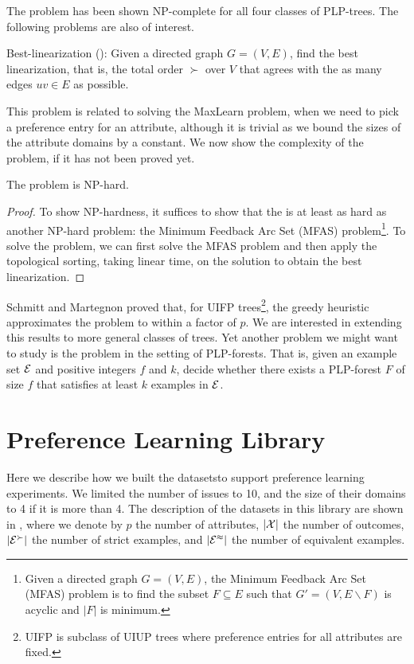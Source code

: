 The  problem has been shown NP-complete
for all four classes of PLP-trees\cite{conf/aaai15/LiuT}.
The following problems are also of interest.

\begin{definition}
	Best-linearization (): Given a directed graph $G=(V,E)$,
	find the best linearization, that is, the total order 
	$\succ$ over $V$ that agrees with the as many 
	edges $uv \in E$ as possible.
\end{definition}
This problem is related to solving the MaxLearn problem,
when we need to pick a preference entry for an attribute,
although it is trivial as we bound the sizes of the
attribute domains by a constant.
We now show the complexity of the  problem,
if it has not been proved yet.

\begin{thm}
	The  problem is NP-hard.
\end{thm}
\begin{proof}
	To show NP-hardness, it suffices to show that the 
	is at least as hard as another NP-hard problem:
	the Minimum Feedback Arc Set (MFAS) problem\footnote{
		Given a directed graph $G=(V,E)$, 
		the Minimum Feedback Arc Set (MFAS) problem 
		is to find the subset
		$F \subseteq E$ such that $G'=(V,E\backslash F)$
		is acyclic and $|F|$ is minimum.
	}.
	To solve the  problem, we can first
	solve the MFAS problem and then apply the topological
	sorting, taking linear time, on the solution to obtain
	the best linearization.
\end{proof}

Schmitt and Martegnon\cite{schmitt2006complexity} proved that, 
for UIFP trees\footnote{
	UIFP is subclass of UIUP trees where preference entries for all
	attributes are fixed.
}, the greedy heuristic approximates the  problem
to within a factor of $p$.
We are interested in extending this results to more general classes
of trees.
Yet another problem we might want to study is the  problem
in the setting of PLP-forests.
That is, given an example set $\mathcal{E}$ and positive integers $f$ and $k$,
decide whether there exists a PLP-forest $F$ of size $f$ that satisfies
at least $k$ examples in $\mathcal{E}$.


\section{Preference Learning Library}
Here we describe how we built the datasets\footnotemark to 
support preference learning experiments.
We limited the number of issues to 10, and the size of
their domains to 4 if it is more than 4.
The description of the datasets in this library are shown
in , where we denote by $p$ the number
of attributes, $|\mathcal{X}|$ the number of outcomes,
$|\mathcal{E}^\succ|$ the number of strict examples, and
$|\mathcal{E}^\approx|$ the number of equivalent examples.

